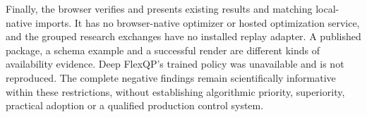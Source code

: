 Finally, the browser verifies and presents existing results and matching
local-native imports. It has no browser-native optimizer or hosted
optimization service, and the grouped research exchanges have no installed
replay adapter. A published package, a schema example and a successful
render are different kinds of availability evidence. Deep FlexQP's trained
policy was unavailable and is not reproduced. The complete negative
findings remain scientifically informative within these restrictions,
without establishing algorithmic priority, superiority, practical adoption
or a qualified production control system.

